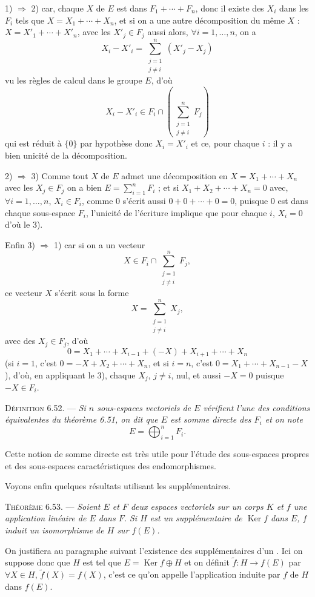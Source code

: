 1) $\Rightarrow$ 2) car, chaque $X$ de $E$ est dans $F_1+\cdots+F_n$, donc il existe des $X_i$ dans les $F_i$ tels que $X=X_1+\cdots+X_n$, et si on a une autre décomposition du même $X$ : $X=X'_1+\cdots+X'_n$, avec les $X'_j\in F_j$ aussi alors, $\forall i=1,\ldots,n$, on a
\[
X_i-X'_i=\sum_{\substack{j=1\\j\ne i}}^n(X'_j-X_j)
\]
vu les règles de calcul dans le groupe $E$, d'où
\[
X_i-X'_i\in F_i\cap\left(\sum_{\substack{j=1\\j\ne i}}^nF_j\right)
\]
qui est réduit à $\{0\}$ par hypothèse donc $X_i=X'_i$ et ce, pour chaque $i$ : il y a bien unicité de la décomposition.

2) $\Rightarrow$ 3) Comme tout $X$ de $E$ admet une décomposition en $X=X_1+\cdots+X_n$ avec les $X_j\in F_j$ on a bien $E=\sum_{i=1}^nF_i$ ; et si $X_1+X_2+\cdots+X_n=0$ avec, $\forall i=1,\ldots,n$, $X_i\in F_i$, comme 0 s'écrit aussi $0+0+\cdots+0=0$, puisque 0 est dans chaque sous-espace $F_i$, l'unicité de l'écriture implique que pour chaque $i$, $X_i=0$ d'où le 3).

Enfin 3) $\Rightarrow$ 1) car si on a un vecteur
\[
X\in F_i\cap\sum_{\substack{j=1\\j\ne i}}^nF_j,
\]
ce vecteur $X$ s'écrit sous la forme
\[
X=\sum_{\substack{j=1\\j\ne i}}^nX_j,
\]
avec des $X_j\in F_j$, d'où
\[
0=X_1+\cdots+X_{i-1}+(-X)+X_{i+1}+\cdots+X_n
\]
(si $i=1$, c'est $0=-X+X_2+\cdots+X_n$, et si $i=n$, c'est $0=X_1+\cdots+X_{n-1}-X$), d'où, en appliquant le 3), chaque $X_j$, $j\ne i$, nul, et aussi $-X=0$ puisque $-X\in F_i$. \bookend

\medskip\noindent\textsc{Définition 6.52.} --- \emph{Si $n$ sous-espaces vectoriels de $E$ vérifient l'une des conditions équivalentes du théorème 6.51, on dit que $E$ est somme directe des $F_i$ et on note
\[
E=\bigoplus_{i=1}^nF_i.
\]}

Cette notion de somme directe est très utile pour l'étude des sous-espaces propres et des sous-espaces caractéristiques des endomorphismes.

Voyons enfin quelques résultats utilisant les supplémentaires.

\medskip\noindent\textsc{Théorème 6.53.} --- \emph{Soient $E$ et $F$ deux espaces vectoriels sur un corps $K$ et $f$ une application linéaire de $E$ dans $F$. Si $H$ est un supplémentaire de $\operatorname{Ker}f$ dans $E$, $f$ induit un isomorphisme de $H$ sur $f(E)$.}

On justifiera au paragraphe suivant l'existence des supplémentaires d'un . Ici on suppose donc que $H$ est tel que $E=\operatorname{Ker}f\oplus H$ et on définit $\widetilde f:H\to f(E)$ par $\forall X\in H$, $\widetilde f(X)=f(X)$, c'est ce qu'on appelle l'application induite par $f$ de $H$ dans $f(E)$.

